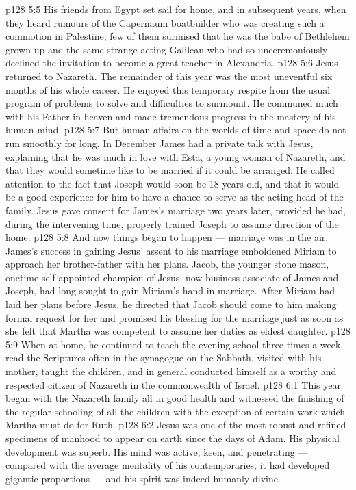 \vs p128 5:5 His friends from Egypt set sail for home, and in subsequent years, when they heard rumours of the Capernaum boatbuilder who was creating such a commotion in Palestine, few of them surmised that he was the babe of Bethlehem grown up and the same strange\hyp{}acting Galilean who had so unceremoniously declined the invitation to become a great teacher in Alexandria.
\vs p128 5:6 \pc Jesus returned to Nazareth. The remainder of this year was the most uneventful six months of his whole career. He enjoyed this temporary respite from the usual program of problems to solve and difficulties to surmount. He communed much with his Father in heaven and made tremendous progress in the mastery of his human mind.
\vs p128 5:7 But human affairs on the worlds of time and space do not run smoothly for long. In December James had a private talk with Jesus, explaining that he was much in love with Esta, a young woman of Nazareth, and that they would sometime like to be married if it could be arranged. He called attention to the fact that Joseph would soon be 18 years old, and that it would be a good experience for him to have a chance to serve as the acting head of the family. Jesus gave consent for James’s marriage two years later, provided he had, during the intervening time, properly trained Joseph to assume direction of the home.
\vs p128 5:8 And now things began to happen --- marriage was in the air. James’s success in gaining Jesus’ assent to his marriage emboldened Miriam to approach her brother\hyp{}father with her plans. Jacob, the younger stone mason, onetime self\hyp{}appointed champion of Jesus, now business associate of James and Joseph, had long sought to gain Miriam’s hand in marriage. After Miriam had laid her plans before Jesus, he directed that Jacob should come to him making formal request for her and promised his blessing for the marriage just as soon as she felt that Martha was competent to assume her duties as eldest daughter.
\vs p128 5:9 \pc When at home, he continued to teach the evening school three times a week, read the Scriptures often in the synagogue on the Sabbath, visited with his mother, taught the children, and in general conducted himself as a worthy and respected citizen of Nazareth in the commonwealth of Israel.
\vs p128 6:1 This year began with the Nazareth family all in good health and witnessed the finishing of the regular schooling of all the children with the exception of certain work which Martha must do for Ruth.
\vs p128 6:2 \pc Jesus was one of the most robust and refined specimens of manhood to appear on earth since the days of Adam. His physical development was superb. His mind was active, keen, and penetrating --- compared with the average mentality of his contemporaries, it had developed gigantic proportions --- and his spirit was indeed humanly divine.
